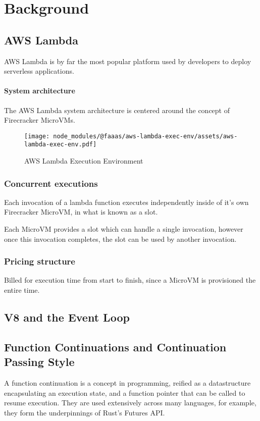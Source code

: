 \chapter{Background}

\section{AWS Lambda}

AWS Lambda is by far the most popular\cite{} \faas{} platform used by developers to deploy serverless applications.

\subsubsection{System architecture}

The AWS Lambda system architecture is centered around the concept of Firecracker MicroVMs\cite{firecracker-microvm}.

\begin{figure*}[t]
    \texttt{[image: node\_modules/@faaas/aws-lambda-exec-env/assets/aws-lambda-exec-env.pdf]}
    \caption{AWS Lambda Execution Environment}
    \label{fig:aws-lambda-exec-env}
\end{figure*}

\subsection{Concurrent executions}

Each invocation of a lambda function executes independently inside of it's own Firecracker MicroVM, in what is known as a slot.

Each MicroVM provides a slot which can handle a single invocation, however once this invocation completes, the slot can be used by another invocation.

\subsection{Pricing structure}

Billed for execution time from start to finish, since a MicroVM is provisioned the entire time.

\section{V8 and the Event Loop}
\label{sec:js-event-loop}


\section{Function Continuations and Continuation Passing Style}
A function continuation is a concept in programming\cite{sussman1975interpreter}, reified as a datastructure encapsulating an execution state, and a function pointer that can be called to resume execution. They are used extensively across many languages, for example, they form the underpinnings of Rust's Futures API.
